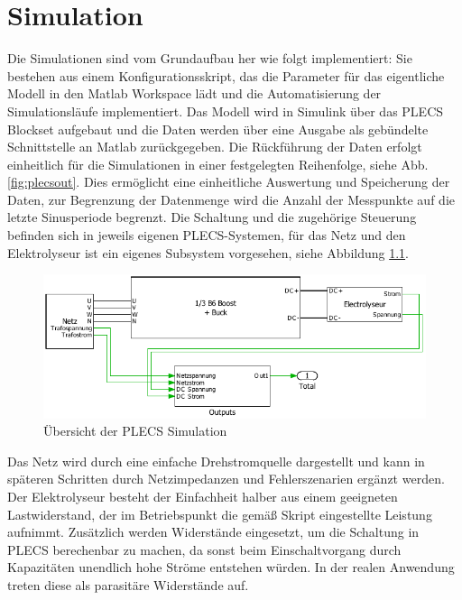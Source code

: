 \chapter{Simulation}
Die Simulationen sind vom Grundaufbau her wie folgt implementiert: Sie bestehen aus einem Konfigurationsskript, das die Parameter für das eigentliche Modell in den Matlab Workspace lädt und die Automatisierung der Simulationsläufe implementiert. Das Modell wird in Simulink über das PLECS Blockset aufgebaut und die Daten werden über eine Ausgabe als gebündelte Schnittstelle an Matlab zurückgegeben. Die Rückführung der Daten erfolgt einheitlich für die Simulationen in einer festgelegten Reihenfolge, siehe Abb. \ref{fig:plecsout}. Dies ermöglicht eine einheitliche Auswertung und Speicherung der Daten, zur Begrenzung der Datenmenge wird die Anzahl der Messpunkte auf die letzte Sinusperiode begrenzt. Die Schaltung und die zugehörige Steuerung befinden sich in jeweils eigenen PLECS-Systemen, für das Netz und den Elektrolyseur ist ein eigenes Subsystem vorgesehen, siehe Abbildung \ref{fig:plecssimulationsaufbau}.  
\begin{figure}
\centering
\includegraphics[width=1\linewidth]{content/Grafiken/PLECS_Simulationsaufbau}
\caption{Übersicht der PLECS Simulation}
\label{fig:plecssimulationsaufbau}
\end{figure}
Das Netz wird durch eine einfache Drehstromquelle dargestellt und kann in späteren Schritten durch Netzimpedanzen und Fehlerszenarien ergänzt werden. Der Elektrolyseur besteht der Einfachheit halber aus einem geeigneten Lastwiderstand, der im Betriebspunkt die gemäß Skript eingestellte Leistung aufnimmt. Zusätzlich werden Widerstände eingesetzt, um die Schaltung in \gls{PLECS} berechenbar zu machen, da sonst beim Einschaltvorgang durch Kapazitäten unendlich hohe Ströme entstehen würden. In der realen Anwendung treten diese als parasitäre Widerstände auf.
